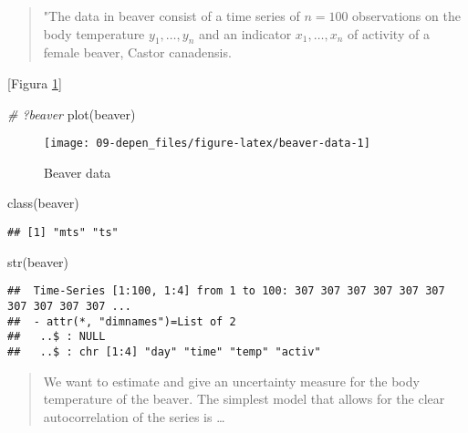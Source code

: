 \documentclass[
]{book}
\newenvironment{Shaded}{\begin{snugshade}}{\end{snugshade}}
\newcommand{\CommentTok}[1]{\textcolor[rgb]{0.56,0.35,0.01}{\textit{#1}}}
\newcommand{\FunctionTok}[1]{\textcolor[rgb]{0.00,0.00,0.00}{#1}}
\newcommand{\NormalTok}[1]{#1}
\theoremstyle{break}
\theoremstyle{definition}
\theoremstyle{definition}
\theoremstyle{definition}
\theoremstyle{definition}
\theoremstyle{remark}
\begin{document}
\begin{quote}
"The data in beaver consist of a time series of \(n = 100\)
observations on the body temperature \(y_1, \ldots, y_n\)
and an indicator \(x_1, \ldots, x_n\) of activity of
a female beaver, Castor canadensis.
\end{quote}

{[}Figura \ref{fig:beaver-data}{]}

\begin{Shaded}
\begin{Highlighting}[]
\CommentTok{\# ?beaver}
\FunctionTok{plot}\NormalTok{(beaver)}
\end{Highlighting}
\end{Shaded}

\begin{figure}[!htb]

{\centering \texttt{[image: 09-depen\_files/figure-latex/beaver-data-1]} 

}

\caption{Beaver data}\label{fig:beaver-data}
\end{figure}

\begin{Shaded}
\begin{Highlighting}[]
\FunctionTok{class}\NormalTok{(beaver)}
\end{Highlighting}
\end{Shaded}

\begin{verbatim}
## [1] "mts" "ts"
\end{verbatim}

\begin{Shaded}
\begin{Highlighting}[]
\FunctionTok{str}\NormalTok{(beaver) }
\end{Highlighting}
\end{Shaded}

\begin{verbatim}
##  Time-Series [1:100, 1:4] from 1 to 100: 307 307 307 307 307 307 307 307 307 307 ...
##  - attr(*, "dimnames")=List of 2
##   ..$ : NULL
##   ..$ : chr [1:4] "day" "time" "temp" "activ"
\end{verbatim}

\begin{quote}
We want to estimate and give an uncertainty measure
for the body temperature of the beaver.
The simplest model that allows for the clear
autocorrelation of the series is \ldots{}
\end{quote}
\end{document}
